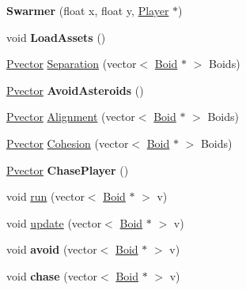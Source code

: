 \begin{DoxyCompactItemize}
\item 
{\bfseries Swarmer} (float x, float y, \hyperlink{class_player}{Player} $\ast$)\hypertarget{class_swarmer_acbc98c4d22c4cf003cc6742e7cf980ab}{}\label{class_swarmer_acbc98c4d22c4cf003cc6742e7cf980ab}

\item 
void {\bfseries Load\+Assets} ()\hypertarget{class_swarmer_a670c7216011b1a009295efe2d2aa84b8}{}\label{class_swarmer_a670c7216011b1a009295efe2d2aa84b8}

\item 
\hyperlink{class_pvector}{Pvector} \hyperlink{class_swarmer_a5f552b9442dcef5ec23c1acd71660df3}{Separation} (vector$<$ \hyperlink{class_boid}{Boid} $\ast$ $>$ Boids)
\item 
\hyperlink{class_pvector}{Pvector} {\bfseries Avoid\+Asteroids} ()\hypertarget{class_swarmer_a5c7b023cf740b5947d09a8f789b5d50c}{}\label{class_swarmer_a5c7b023cf740b5947d09a8f789b5d50c}

\item 
\hyperlink{class_pvector}{Pvector} \hyperlink{class_swarmer_a5e6ce35ee09287cc288c43dc4cc15beb}{Alignment} (vector$<$ \hyperlink{class_boid}{Boid} $\ast$ $>$ Boids)
\item 
\hyperlink{class_pvector}{Pvector} \hyperlink{class_swarmer_acbade5306e05b325c30431fd662f6084}{Cohesion} (vector$<$ \hyperlink{class_boid}{Boid} $\ast$ $>$ Boids)
\item 
\hyperlink{class_pvector}{Pvector} {\bfseries Chase\+Player} ()\hypertarget{class_swarmer_a3a2c0465d28a7b0856bb7d6f8819d0fe}{}\label{class_swarmer_a3a2c0465d28a7b0856bb7d6f8819d0fe}

\item 
void \hyperlink{class_swarmer_a29c7d44ad87b663ed71cb8d23bc14f0f}{run} (vector$<$ \hyperlink{class_boid}{Boid} $\ast$ $>$ v)
\item 
void \hyperlink{class_swarmer_a02959b4af97e6c0979c20f0b8298635b}{update} (vector$<$ \hyperlink{class_boid}{Boid} $\ast$ $>$ v)
\item 
void {\bfseries avoid} (vector$<$ \hyperlink{class_boid}{Boid} $\ast$ $>$ v)\hypertarget{class_swarmer_a835556f89ae34a62302d6e80f6be053b}{}\label{class_swarmer_a835556f89ae34a62302d6e80f6be053b}

\item 
void {\bfseries chase} (vector$<$ \hyperlink{class_boid}{Boid} $\ast$ $>$ v)\hypertarget{class_swarmer_afcbd4b37f2c2a0ce5018c5999edc4aca}{}\label{class_swarmer_afcbd4b37f2c2a0ce5018c5999edc4aca}


\end{DoxyCompactItemize}
